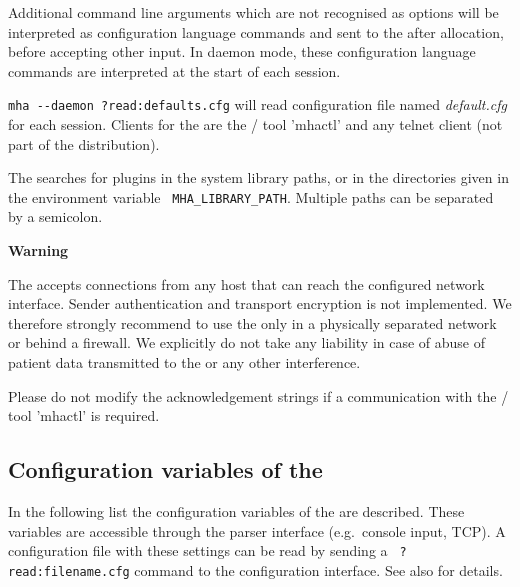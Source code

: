 Additional command line arguments which are not recognised as options
will be interpreted as \mha{} configuration language commands and sent to the
\mhad{} after allocation, before accepting other input.
%
In daemon mode, these \mha{} configuration language commands are interpreted at the 
start of each session.

\verb!mha --daemon ?read:defaults.cfg! will read
configuration file named \emph{default.cfg} for each session.
%
Clients for the \mhad{} are the \Octave{}/ \Matlab{} tool 'mhactl' and any
telnet client (not part of the distribution).

The \mhad{} searches for \mha{} plugins in the system library paths, or in
the directories given in the environment variable {\tt
MHA\_LIBRARY\_PATH}.
%
Multiple paths can be separated by a semicolon.

\textbf{Warning}

The \mhad{} accepts connections from any host that can reach
the configured network interface.
%
Sender authentication and transport encryption is not implemented.
%
We therefore strongly recommend to use the \mhad{} only in a
physically separated network or behind a firewall.
%
We explicitly do not take any liability in case of abuse of patient
data transmitted to the \mhad{} or any other interference.

Please do not modify the acknowledgement strings if a communication
with the \Octave{}/ \Matlab{} tool 'mhactl' is required.

\subsection{Configuration variables of the \mhad{}}

In the following list the configuration variables of the \mhad{} are
described. These variables are accessible through the parser interface
(e.g.\ console input, TCP).
%
A configuration file with these settings can be read by sending a {\tt
?read:filename.cfg} command to the configuration interface. See also
 for details.

